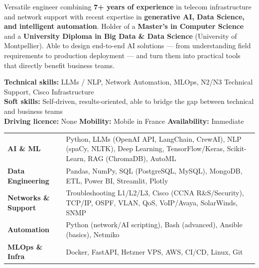 \documentclass[11pt,a4paper]{article}
\begin{document}
\cvheader{\textcolor{black}{\LARGE AI Engineer \& Data Scientist — IT \& Network Support}}

\noindent
Versatile engineer combining \textbf{7+ years of experience} in telecom infrastructure and network support with recent expertise in \textbf{generative AI, Data Science, and intelligent automation}. Holder of a \textbf{Master's in Computer Science} and a \textbf{University Diploma in Big Data \& Data Science} (University of Montpellier). Able to design end-to-end AI solutions — from understanding field requirements to production deployment — and turn them into practical tools that directly benefit business teams.

\noindent\vspace{0.4em}
\textbf{Technical skills:} LLMs / NLP, Network Automation, MLOps, N2/N3 Technical Support, Cisco Infrastructure\\
\textbf{Soft skills:} Self-driven, results-oriented, able to bridge the gap between technical and business teams\\
\textbf{Driving licence:} None \quad \textbf{Mobility:} Mobile in France \quad \textbf{Availability:} Immediate

\noindent
\begin{tabularx}{\linewidth}{@{} p{3.5cm} X @{}}
\textbf{AI \& ML} & Python, LLMs (OpenAI API, LangChain, CrewAI), NLP (spaCy, NLTK), Deep Learning, TensorFlow/Keras, Scikit-Learn, RAG (ChromaDB), AutoML \\
\textbf{Data Engineering} & Pandas, NumPy, SQL (PostgreSQL, MySQL), MongoDB, ETL, Power BI, Streamlit, Plotly \\
\textbf{Networks \& Support} & Troubleshooting L1/L2/L3, Cisco (CCNA R\&S/Security), TCP/IP, OSPF, VLAN, QoS, VoIP/Avaya, SolarWinds, SNMP \\
\textbf{Automation} & Python (network/AI scripting), Bash (advanced), Ansible (basics), Netmiko \\
\textbf{MLOps \& Infra} & Docker, FastAPI, Hetzner VPS, AWS, CI/CD, Linux, Git \\
\end{tabularx}
\end{document}
